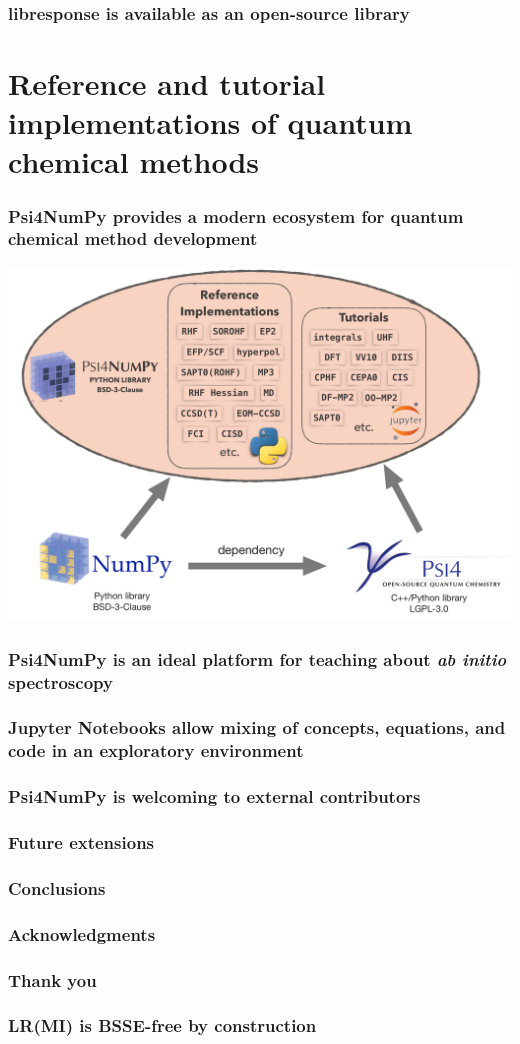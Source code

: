\documentclass[%
    draft,%
    xcolor=usenames,dvipsnames,svgnames%
]{beamer}
\newcommand\pfn{Psi4NumPy}
\begin{document}
\begin{frame}
  \frametitle{libresponse is available as an open-source library}
\end{frame}

\section{Reference and tutorial implementations of quantum chemical methods}

\begin{frame}
  \frametitle{\pfn{} provides a modern ecosystem for quantum chemical method development}
  \centering
  \includegraphics[width=\linewidth,keepaspectratio]{./figures/psi4numpy_ecosystem2.pdf}
\end{frame}

\begin{frame}
  \frametitle{\pfn{} is an ideal platform for teaching about \textit{ab initio} spectroscopy}
\end{frame}

\begin{frame}
  \frametitle{Jupyter Notebooks allow mixing of concepts, equations, and code in an exploratory environment}
\end{frame}

\begin{frame}
  \frametitle{\pfn{} is welcoming to external contributors}
\end{frame}

\begin{frame}
  \frametitle{Future extensions}
\end{frame}

\begin{frame}
  \frametitle{Conclusions}
\end{frame}

\begin{frame}
  \frametitle{Acknowledgments}
\end{frame}

\begin{frame}
  \frametitle{Thank you}
\end{frame}

\appendix

\begin{frame}
  \frametitle{LR(MI) is BSSE-free by construction}
\end{frame}

\immediate\closeout\tempfile
\end{document}
